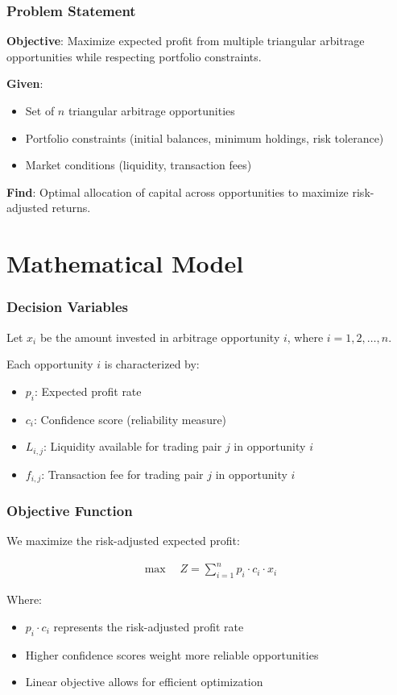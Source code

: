 \documentclass{beamer}
\begin{document}
\begin{frame}
\frametitle{Problem Statement}
\textbf{Objective}: Maximize expected profit from multiple triangular arbitrage opportunities while respecting portfolio constraints.

\vspace{0.5cm}

\textbf{Given}:
\begin{itemize}
    \item Set of $n$ triangular arbitrage opportunities
    \item Portfolio constraints (initial balances, minimum holdings, risk tolerance)
    \item Market conditions (liquidity, transaction fees)
\end{itemize}

\vspace{0.5cm}

\textbf{Find}: Optimal allocation of capital across opportunities to maximize risk-adjusted returns.
\end{frame}

\section{Mathematical Model}

\begin{frame}
\frametitle{Decision Variables}
Let $x_i$ be the amount invested in arbitrage opportunity $i$, where $i = 1, 2, \ldots, n$.

\vspace{0.5cm}

Each opportunity $i$ is characterized by:
\begin{itemize}
    \item $p_i$: Expected profit rate
    \item $c_i$: Confidence score (reliability measure)
    \item $L_{i,j}$: Liquidity available for trading pair $j$ in opportunity $i$
    \item $f_{i,j}$: Transaction fee for trading pair $j$ in opportunity $i$
\end{itemize}
\end{frame}

\begin{frame}
\frametitle{Objective Function}
We maximize the risk-adjusted expected profit:

\begin{align}
\max \quad Z = \sum_{i=1}^{n} p_i \cdot c_i \cdot x_i
\end{align}

Where:
\begin{itemize}
    \item $p_i \cdot c_i$ represents the risk-adjusted profit rate
    \item Higher confidence scores weight more reliable opportunities
    \item Linear objective allows for efficient optimization
\end{itemize}
\end{frame}
\end{document}

